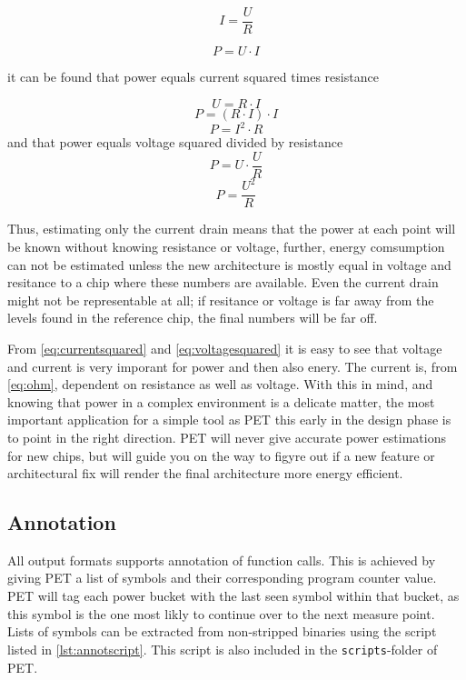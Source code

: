 \begin{equation}
I=\frac{U}{R}
\label{eq:ohm}
\end{equation}

\begin{equation}
P=U \cdot I
\label{eq:power}
\end{equation}

it can be found that power equals current squared times resistance

\[U=R \cdot I\]
\[P=(R \cdot I) \cdot I\]
\begin{equation}
P=I^2 \cdot R
\label{eq:currentsquared}
\end{equation}
and that power equals voltage squared divided by resistance
\[P=U \cdot \frac{U}{R}\]
\begin{equation}
P=\frac{U^2}{R}
\label{eq:voltagesquared}
\end{equation}

Thus, estimating only the current drain means that the power at each point will
be known without knowing resistance or voltage, further, energy comsumption can
not be estimated unless the new architecture is mostly equal in voltage and
resitance to a chip where these numbers are available. Even the current drain
might not be representable at all; if resitance or voltage is far away from the
levels found in the reference chip, the final numbers will be far off.

From \autoref{eq:currentsquared} and \autoref{eq:voltagesquared} it is easy to
see that voltage and current is very imporant for power and then also enery. The
current is, from \autoref{eq:ohm}, dependent on resistance as well as voltage.
With this in mind, and knowing that power in a complex environment is a delicate
matter, the most important application for a simple tool as PET this early in
the design phase is to point in the right direction. PET will never give
accurate power estimations for new chips, but will guide you on the way to
figyre out if a new feature or architectural fix will render the final
architecture more energy efficient.

\subsection{Annotation}

All output formats supports annotation of function calls. This is achieved by
giving PET a list of symbols and their corresponding program counter value. PET
will tag each power bucket with the last seen symbol within that bucket, as this
symbol is the one most likly to continue over to the next measure point. Lists
of symbols can be extracted from non-stripped binaries using the script listed
in \autoref{lst:annotscript}. This script is also included in the \texttt{scripts}-folder
of PET.

